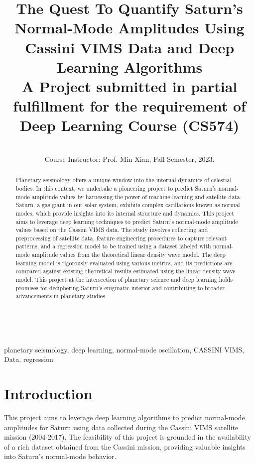 \documentclass[conference]{IEEEtran}
\begin{document}
\title{The Quest To Quantify Saturn's Normal-Mode Amplitudes
Using Cassini VIMS Data and Deep Learning Algorithms \\[0.5ex] \large A Project submitted in partial fulfillment for the requirement of Deep
Learning Course (CS574)}\\

\author{
\\
{Course Instructor: Prof. Min Xian, Fall Semester, 2023.}
}

\maketitle

\begin{abstract}
Planetary seismology offers a unique window into the internal dynamics of celestial bodies. In this context, we
undertake a pioneering project to predict Saturn's normal-mode amplitude values by harnessing the power of
machine learning and satellite data. Saturn, a gas giant in our solar system, exhibits complex oscillations known
as normal modes, which provide insights into its internal structure and dynamics. This project aims to leverage
deep learning techniques to predict Saturn's normal-mode amplitude values based on the Cassini VIMS data.
The study involves collecting and preprocessing of satellite data, feature engineering procedures to capture
relevant patterns, and a regression model to be trained using a dataset labeled with normal-mode amplitude
values from the theoretical linear density wave model. The deep learning model is rigorously evaluated using
various metrics, and its predictions are compared against existing theoretical results estimated using the linear
density wave model. This project at the intersection of planetary science and deep learning holds promises for
deciphering Saturn's enigmatic interior and contributing to broader advancements in planetary studies.
\end{abstract}

\begin{IEEEkeywords}
planetary seismology, deep learning, normal-mode oscillation, CASSINI VIMS, Data, regression
\end{IEEEkeywords}

\section{Introduction}
This project aims to leverage deep learning algorithms to predict normal-mode amplitudes for Saturn using data
collected during the Cassini VIMS satellite mission (2004-2017). The feasibility of this project is grounded in
the availability of a rich dataset obtained from the Cassini mission, providing valuable insights into Saturn's
normal-mode behavior.
\end{document}
